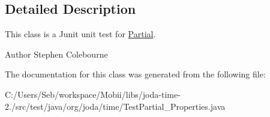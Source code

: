 \subsection{Detailed Description}
This class is a Junit unit test for \hyperlink{classorg_1_1joda_1_1time_1_1_partial}{Partial}.

\begin{DoxyAuthor}{Author}
Stephen Colebourne 
\end{DoxyAuthor}


The documentation for this class was generated from the following file\-:\begin{DoxyCompactItemize}
\item 
C\-:/\-Users/\-Seb/workspace/\-Mobii/libs/joda-\/time-\/2./src/test/java/org/joda/time/Test\-Partial\-\_\-\-Properties.\-java\end{DoxyCompactItemize}
